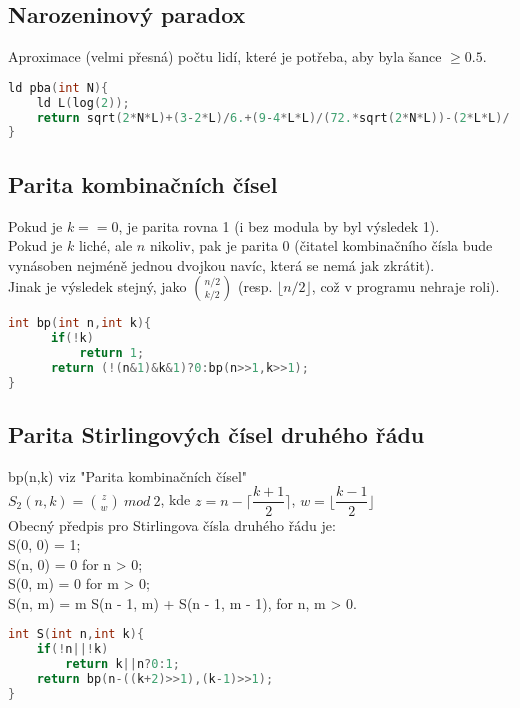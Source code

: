 \documentclass[11pt]{article}
\begin{document}
\subsection{Narozeninový paradox}
Aproximace (velmi přesná) počtu lidí, které je potřeba, aby byla šance $\geq 0.5$.
\begin{lstlisting}[language=C++]
ld pba(int N){
    ld L(log(2));
    return sqrt(2*N*L)+(3-2*L)/6.+(9-4*L*L)/(72.*sqrt(2*N*L))-(2*L*L)/(135.*N);
}
\end{lstlisting}
\subsection{Parita kombinačních čísel}
Pokud je $k==0$, je parita rovna 1 (i bez modula by byl výsledek 1).
\\Pokud je $k$ liché, ale $n$ nikoliv, pak je parita 0 (čitatel kombinačního čísla bude vynásoben nejméně jednou dvojkou navíc, která se nemá jak zkrátit).
\\Jinak je výsledek stejný, jako ${n/2\choose k/2}$ (resp. ${\lfloor n/2\rfloor}$, což v programu nehraje roli).
\begin{lstlisting}[language=C++]
int bp(int n,int k){
      if(!k)
          return 1;
      return (!(n&1)&k&1)?0:bp(n>>1,k>>1); 
}
\end{lstlisting}
\subsection{Parita Stirlingových čísel druhého řádu}
bp(n,k) viz "Parita kombinačních čísel"
\\$S_2(n,k)={z\choose w}\ mod\ 2$, kde $z=n-{\lceil\dfrac{k+1}{2}\rceil}$, $w={\lfloor\dfrac{k-1}{2}\rfloor}$
\\Obecný předpis pro Stirlingova čísla druhého řádu je:
\\S(0, 0) = 1; 
\\S(n, 0) = 0 for n > 0; 
\\S(0, m) = 0 for m > 0;
\\S(n, m) = m S(n - 1, m) + S(n - 1, m - 1), for n, m > 0.
\vspace{2mm}
\begin{lstlisting}[language=C++]
int S(int n,int k){
    if(!n||!k)
        return k||n?0:1;
    return bp(n-((k+2)>>1),(k-1)>>1);
}
\end{lstlisting}
\end{document}
